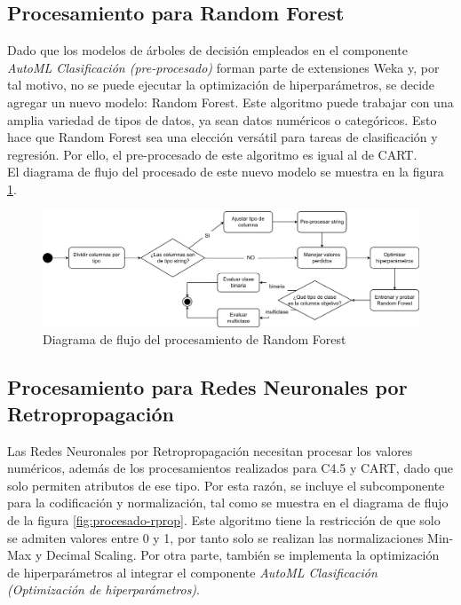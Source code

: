 \subsection{Procesamiento para Random Forest}
Dado que los modelos de árboles de decisión empleados en el componente \textit{AutoML Clasificación (pre-procesado)} forman parte de extensiones Weka y, por tal motivo, no se puede ejecutar la optimización de hiperparámetros, se decide agregar un nuevo modelo: Random Forest. Este algoritmo puede trabajar con una amplia variedad de tipos de datos, ya sean datos numéricos o categóricos. Esto hace que Random Forest sea una elección versátil para tareas de clasificación y regresión. Por ello, el pre-procesado de este algoritmo es igual al de CART. \\
El diagrama de flujo del procesado de este nuevo modelo se muestra en la figura \ref{fig:procesado-rf}.

\begin{figure}[H]
	\centering
	\includegraphics[width=1\linewidth]{"figuras/capi 2/modelos/procesado rf.drawio"}
	\caption{Diagrama de flujo del procesamiento de Random Forest}
	\label{fig:procesado-rf}
\end{figure}


\subsection{Procesamiento para Redes Neuronales por Retropropagación}
Las Redes Neuronales por Retropropagación necesitan procesar los valores numéricos, además de los procesamientos realizados para C4.5 y CART, dado que solo permiten atributos de ese tipo. Por esta razón, se incluye el subcomponente para la codificación y normalización, tal como se muestra en el diagrama de flujo de la figura \ref{fig:procesado-rprop}. Este algoritmo tiene la restricción de que solo se admiten valores entre 0 y 1, por tanto solo se realizan las normalizaciones Min-Max y Decimal Scaling. Por otra parte, también se implementa la optimización de hiperparámetros al integrar el componente \textit{AutoML Clasificación (Optimización de hiperparámetros)}.

